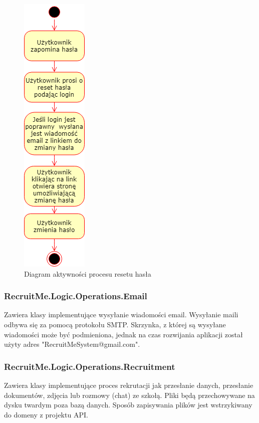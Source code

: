 \documentclass{article}
\begin{document}
\begin{figure}[H]
\centering
\includegraphics[scale=0.5]{images/resetHasla.png}
\caption{Diagram aktywności procesu resetu hasła}
\end{figure}

\subsubsection{RecruitMe.Logic.Operations.Email}
Zawiera klasy implementujące wysyłanie wiadomości email. Wysyłanie maili odbywa się za pomocą protokołu SMTP. Skrzynka, z której są wysyłane wiadomości może być podmieniona, jednak na czas rozwijania aplikacji został użyty adres "RecruitMeSystem@gmail.com".

\subsubsection{RecruitMe.Logic.Operations.Recruitment}
Zawiera klasy implementujące proces rekrutacji jak przesłanie danych, przesłanie dokumentów, zdjęcia lub rozmowy (chat) ze szkołą. Pliki będą przechowywane na dysku twardym poza bazą danych. Sposób zapisywania plików jest wstrzykiwany do domeny z projektu API.
\end{document}
